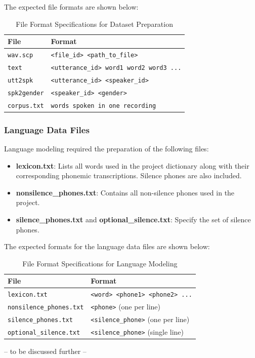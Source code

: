 \vspace{1em}

The expected file formats are shown below:

\begin{table}[H]
\centering
\renewcommand{\arraystretch}{1.3}
\setlength{\tabcolsep}{10pt}
\caption{File Format Specifications for Dataset Preparation}
\label{tab:fileformats}
\begin{tabular}{|l|l|}
\hline
\textbf{File} & \textbf{Format} \\
\hline
\texttt{wav.scp} & \texttt{<file\_id> <path\_to\_file>} \\
\texttt{text} & \texttt{<utterance\_id> word1 word2 word3 ...} \\
\texttt{utt2spk} & \texttt{<utterance\_id> <speaker\_id>} \\
\texttt{spk2gender} & \texttt{<speaker\_id> <gender>} \\
\texttt{corpus.txt} & \texttt{words spoken in one recording} \\
\hline
\end{tabular}
\end{table}

\subsubsection{Language Data Files}

Language modeling required the preparation of the following files:

\begin{itemize}
    \item \textbf{lexicon.txt}: Lists all words used in the project dictionary along with their corresponding phonemic transcriptions. Silence phones are also included.
    \item \textbf{nonsilence\_phones.txt}: Contains all non-silence phones used in the project.
    \item \textbf{silence\_phones.txt} and \textbf{optional\_silence.txt}: Specify the set of silence phones.
\end{itemize}

\vspace{1em}

The expected formats for the language data files are shown below:

\begin{table}[H]
\centering
\renewcommand{\arraystretch}{1.3}
\setlength{\tabcolsep}{10pt}
\caption{File Format Specifications for Language Modeling}
\label{tab:languageformats}
\begin{tabular}{|l|l|}
\hline
\textbf{File} & \textbf{Format} \\
\hline
\texttt{lexicon.txt} & \texttt{<word> <phone1> <phone2> ...} \\
\texttt{nonsilence\_phones.txt} & \texttt{<phone>} (one per line) \\
\texttt{silence\_phones.txt} & \texttt{<silence\_phone>} (one per line) \\
\texttt{optional\_silence.txt} & \texttt{<silence\_phone>} (single line) \\
\hline
\end{tabular}
\end{table}

\vspace{1em}

-- to be discussed further --



